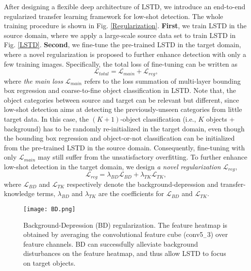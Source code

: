 \documentclass[letterpaper]{article} \usepackage{aaai18}  \usepackage{times}  \usepackage{helvet}  \usepackage{courier}  \usepackage{url}  \usepackage{graphicx}
\begin{document}
After designing a flexible deep architecture of LSTD,
we introduce an end-to-end regularized transfer learning framework for low-shot detection.
The whole training procedure is shown in Fig. \ref{Regularization}.
\textbf{First},
we train LSTD in the source domain,
where
we apply a large-scale source data set to train LSTD in Fig. \ref{LSTD}.
\textbf{Second},
we fine-tune the pre-trained LSTD in the target domain,
where a novel regularization is proposed to further enhance detection with only a few training images.
Specifically,
the total loss of fine-tuning can be written as
\begin{equation}
\mathcal{L}_{total}=\mathcal{L}_{main}+\mathcal{L}_{reg},
\label{eq:totalloss}
\end{equation}
where
\textit{the main loss} $\mathcal{L}_{main}$ refers to the loss summation of multi-layer bounding box regression and coarse-to-fine object classification in LSTD.
Note that,
the object categories between source and target can be relevant but different,
since low-shot detection aims at detecting the previously-unseen categories from little target data.
In this case,
the $(K+1)$-object classification (i.e., $K$ objects + background) has to be randomly re-initialized in the target domain,
even though the bounding box regression and object-or-not classification can be initialized from the pre-trained LSTD in the source domain.
Consequently,
fine-tuning with only $\mathcal{L}_{main}$ may still suffer from the unsatisfactory overfitting.
To further enhance low-shot detection in the target domain,
we design \textit{a novel regularization} $\mathcal{L}_{reg}$,
\begin{equation}
\mathcal{L}_{reg}=\lambda_{BD}\mathcal{L}_{BD}+\lambda_{TK}\mathcal{L}_{TK},
\label{eq:regloss}
\end{equation}
where
$\mathcal{L}_{BD}$ and $\mathcal{L}_{TK}$ respectively denote the background-depression and transfer-knowledge terms,
$\lambda_{BD}$ and $\lambda_{TK}$ are the coefficients for $\mathcal{L}_{BD}$ and $\mathcal{L}_{TK}$.



\begin{figure}[t]
\centering
\texttt{[image: BD.png]}
\caption{Background-Depression (BD) regularization.
The feature heatmap is obtained by averaging the convolutional feature cube (conv5$_{-}$3) over feature channels.
BD can successfully alleviate background disturbances on the feature heatmap,
and thus allow LSTD to focus on target objects.}
\label{BDRegularization}
\end{figure}
\end{document}
